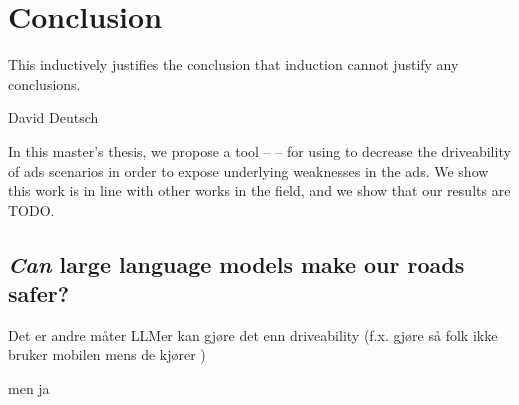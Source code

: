\chapter{Conclusion}\label{chp:conclusion}

\epigraph{This inductively justifies the conclusion that induction cannot justify any conclusions.}{David Deutsch}

In this master's thesis, we propose a tool -- \hefe -- for using  to decrease the
driveability of \acrfull{ads} scenarios in order to expose underlying weaknesses in the
\acrshort{ads}. We show this work is in line with other works in the field, and we show that our
results are TODO.

\section{\emph{Can} large language models make our roads safer?} %

Det er andre måter LLMer kan gjøre det enn driveability (f.x. gjøre så folk ikke bruker mobilen mens
de kjører )

men ja